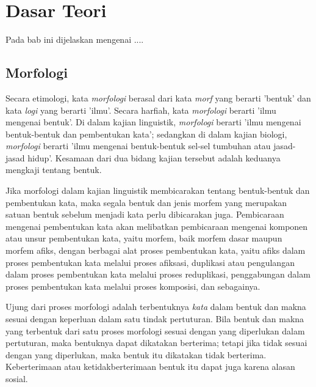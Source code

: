 \chapter{Dasar Teori}
\label{chap:dasarTeori}

Pada bab ini dijelaskan mengenai ....

\section{Morfologi}
\label{sec:morfologi}

Secara etimologi, kata \textit{morfologi} berasal dari kata \textit{morf} yang berarti 'bentuk' dan kata \textit{logi} yang berarti 'ilmu'\cite{chaer:08:morfologi}. Secara harfiah, kata \textit{morfologi} berarti 'ilmu mengenai bentuk'. Di dalam kajian linguistik, \textit{morfologi} berarti 'ilmu mengenai bentuk-bentuk dan pembentukan kata'; sedangkan di dalam kajian biologi, \textit{morfologi} berarti 'ilmu mengenai bentuk-bentuk sel-sel tumbuhan atau jasad-jasad hidup'. Kesamaan dari dua bidang kajian tersebut adalah keduanya mengkaji tentang bentuk. 

Jika morfologi dalam kajian linguistik membicarakan tentang bentuk-bentuk dan pembentukan kata, maka segala bentuk dan jenis morfem yang merupakan satuan bentuk sebelum menjadi kata perlu dibicarakan juga. Pembicaraan mengenai pembentukan kata akan melibatkan pembicaraan mengenai komponen atau unsur pembentukan kata, yaitu morfem, baik morfem dasar maupun morfem afiks, dengan berbagai alat proses pembentukan kata, yaitu afiks dalam proses pembentukan kata melalui proses afiksasi, duplikasi atau pengulangan dalam proses pembentukan kata melalui proses reduplikasi, penggabungan dalam proses pembentukan kata melalui proses komposisi, dan sebagainya. 

Ujung dari proses morfologi adalah terbentuknya \textit{kata} dalam bentuk dan makna sesuai dengan keperluan dalam satu tindak pertuturan. Bila bentuk dan makna yang terbentuk dari satu proses morfologi sesuai dengan yang diperlukan dalam pertuturan, maka bentuknya dapat dikatakan berterima; tetapi jika tidak sesuai dengan yang diperlukan, maka bentuk itu dikatakan tidak berterima. Keberterimaan atau ketidakberterimaan bentuk itu dapat juga karena alasan sosial.



